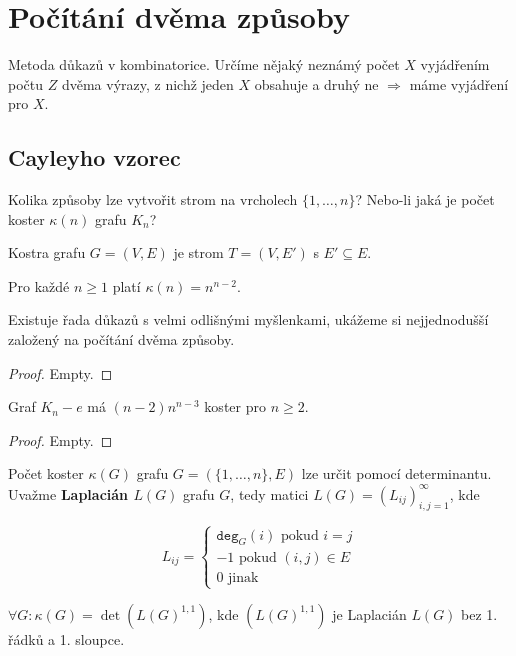\chapter{Počítání dvěma způsoby}

Metoda důkazů v kombinatorice. Určíme nějaký neznámý počet $X$ vyjádřením počtu $Z$ dvěma výrazy, z nichž jeden $X$ obsahuje a druhý ne $\Rightarrow$ máme vyjádření pro $X$.

\section{Cayleyho vzorec}

Kolika způsoby lze vytvořit strom na vrcholech $\{ 1, \dots , n \}$? Nebo-li jaká je počet koster $\kappa (n)$ grafu $K_{n}$? 

\begin{definice}
	Kostra grafu $G = (V, E)$ je strom $T = (V, E')$ s $E' \subseteq E$.
\end{definice}


\begin{veta}
	Pro každé $n \geq 1$ platí $\kappa (n) = n^{n-2}$.
\end{veta}

Existuje řada důkazů s velmi odlišnými myšlenkami, ukážeme si nejjednodušší založený na počítání dvěma způsoby.

\begin{proof}
	Empty.
\end{proof}

\begin{veta}
	Graf $K_{n}-e$ má $(n-2)n^{n-3}$ koster pro $n \geq 2$.
\end{veta}

\begin{proof}
	Empty.
\end{proof}


Počet koster $\kappa (G)$ grafu $G = (\{ 1, \dots , n \}, E)$ lze určit pomocí determinantu. Uvažme \textbf{Laplacián $L(G)$} grafu $G$, tedy matici $L(G) = (L_{ij})_{i,j=1}^{\infty}$, kde

$$
L_{ij} =
\left\{
\begin{array}{ll}
	\mathtt{deg}_{G}(i) \text{ pokud } i=j \\
	-1 \text{ pokud } (i,j) \in E \\
	0 \text{ jinak }
\end{array}
\right.
$$

\begin{veta}
	$\forall G : \kappa (G) = \det (L(G)^{1,1})$, kde $(L(G)^{1,1})$ je Laplacián $L(G)$ bez 1. řádků a 1. sloupce.
\end{veta}

